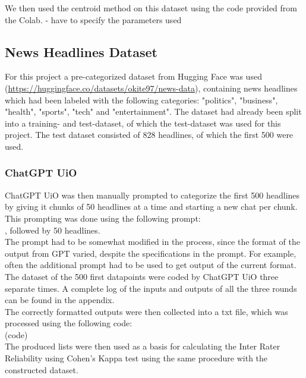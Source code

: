 \begin{flushleft}
We then used the centroid method on this dataset using the code provided from the Colab. - have to specify the parameters used

\subsection{News Headlines Dataset}
For this project a pre-categorized dataset from Hugging Face was used (\url{https://huggingface.co/datasets/okite97/news-data}), containing news headlines which had been labeled with the following categories: "politics", "business", "health", "sports", "tech" and "entertainment".
The dataset had already been split into a training- and test-dataset, of which the test-dataset was used for this project. 
The test dataset consisted of 828 headlines, of which the first 500 were used. \\

\subsubsection{ChatGPT UiO}
ChatGPT UiO was then manually prompted to categorize the first 500 headlines by giving it chunks of 50 headlines at a time and starting a new chat per chunk. This prompting 
was done using the following prompt:\\[5pt]
,
 followed by 50 headlines.\\[5pt]
The prompt had to be somewhat modified in the process, since the format of the output from GPT varied, despite the specifications in the prompt. 
For example, often the additional prompt  had to be used to get output of the current format.
The dataset of the 500 first datapoints were coded by ChatGPT UiO three separate times. A complete log of the inputs and outputs of all the three rounds can be found in the appendix.\\[10pt]
The correctly formatted outputs were then collected into a txt file, which was processed using the following code:\\
(code)\\
The produced lists were then used as a basis for calculating the Inter Rater Reliability using Cohen's Kappa test using the same procedure with the constructed dataset.\\


\end{flushleft}
